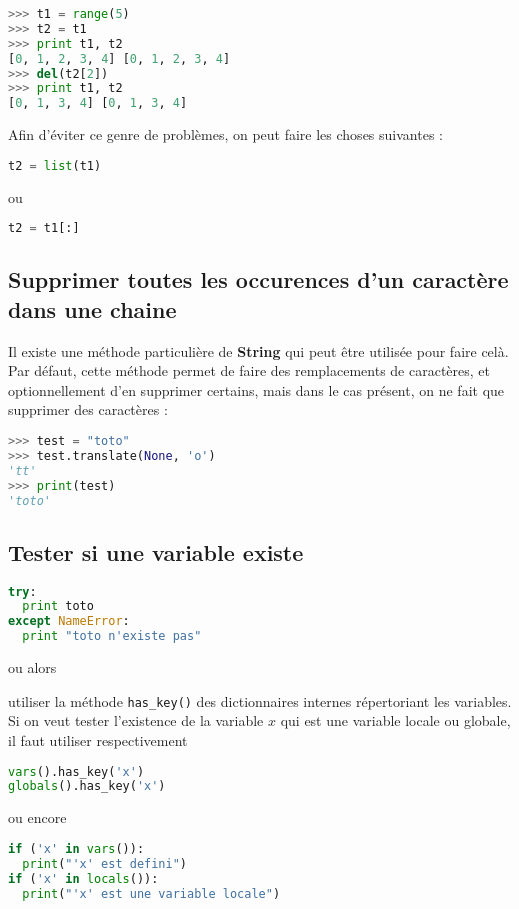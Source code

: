 \documentclass[a4paper,twoside]{article}
\begin{document}
\begin{exemple}
\begin{lstlisting}[language=python]
>>> t1 = range(5)
>>> t2 = t1
>>> print t1, t2
[0, 1, 2, 3, 4] [0, 1, 2, 3, 4]
>>> del(t2[2])
>>> print t1, t2
[0, 1, 3, 4] [0, 1, 3, 4]
\end{lstlisting}
\end{exemple}

Afin d'éviter ce genre de problèmes, on peut faire les choses suivantes :
\begin{lstlisting}[language=python]
t2 = list(t1)
\end{lstlisting}
ou
\begin{lstlisting}[language=python]
t2 = t1[:]
\end{lstlisting}

\subsection{Supprimer toutes les occurences d'un caractère dans une chaine}
Il existe une méthode particulière de \textbf{String} qui peut être utilisée pour faire celà. Par défaut, cette méthode permet de faire des remplacements de caractères, et optionnellement d'en supprimer certains, mais dans le cas présent, on ne fait que supprimer des caractères : 
\begin{lstlisting}[language=python]
>>> test = "toto"
>>> test.translate(None, 'o')
'tt'
>>> print(test)
'toto'
\end{lstlisting}

\subsection{Tester si une variable existe}
\begin{lstlisting}[language=python]
try:
  print toto
except NameError:
  print "toto n'existe pas"
\end{lstlisting}

ou alors

utiliser la méthode \texttt{has\_key()} des dictionnaires internes répertoriant les variables. Si on veut tester l'existence de la variable $x$  qui est une variable locale ou globale, il faut utiliser respectivement
\begin{lstlisting}[language=python]
vars().has_key('x')
globals().has_key('x')
\end{lstlisting}

ou encore
\begin{lstlisting}[language=python]
if ('x' in vars()):
  print("'x' est defini")
if ('x' in locals()):
  print("'x' est une variable locale")
\end{lstlisting}
\end{document}
